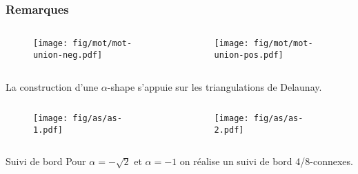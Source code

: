 \begin{frame}
\begin{columns}[t]
\begin{column}{6cm}
    \end{column}
  \end{columns}
\end{frame}


\begin{frame}
  \frametitle{Remarques}
  {
    \begin{columns}[t]
      \begin{column}{5cm}
        \begin{figure}[h!]
          \centering
          \texttt{[image: fig/mot/mot-union-neg.pdf]}
         \end{figure}
       \end{column}
       \begin{column}{5cm}
         \begin{figure}[h!]
           \centering
           \texttt{[image: fig/mot/mot-union-pos.pdf]}
         \end{figure}
       \end{column}
    \end{columns}
    
    \begin{block}{}
      La construction d'une $\alpha$-shape s'appuie sur les triangulations de Delaunay.    
    \end{block}
  }
  {
    \begin{columns}[t]
      \begin{column}{5cm}
        \begin{figure}[h!]
          \centering
          \texttt{[image: fig/as/as-1.pdf]}
         \end{figure}
       \end{column}
       \begin{column}{5cm}
         \begin{figure}[h!]
           \centering
           \texttt{[image: fig/as/as-2.pdf]}
         \end{figure}
       \end{column}
    \end{columns}
    
    \begin{block}{Suivi de bord}
      Pour $\alpha = -\sqrt{2}$ et $\alpha = -1$ on réalise un suivi de bord 4/8-connexes.   
    \end{block}
  }
\end{frame}

